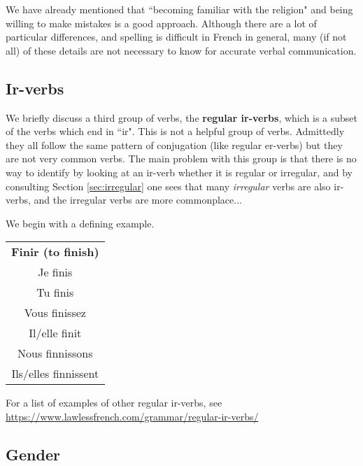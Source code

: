 \documentclass[12pt]{article}
\theoremstyle{plain}
\theoremstyle{definition}
\begin{document}
	We have already mentioned that ``becoming familiar with the religion" and being willing to make mistakes is a good approach. Although there are a lot of particular differences, and spelling is difficult in French in general, many (if not all) of these details are not necessary to know for accurate verbal communication.
	
	\subsection{Ir-verbs}
	We briefly discuss a third group of verbs, the \textbf{regular ir-verbs}, which is a subset of the verbs which end in ``ir". This is not a helpful group of verbs. Admittedly they all follow the same pattern of conjugation (like regular er-verbs) but they are not very common verbs. The main problem with this group is that there is no way to identify by looking at an ir-verb whether it is regular or irregular, and by consulting Section \ref{sec:irregular} one sees that many \emph{irregular} verbs are also ir-verbs, and the irregular verbs are more commonplace...
	
	We begin with a defining example.
	\begin{center}
		\begin{tabular}{|c|}
			\hline
			\textbf{Finir (to finish)}\\
			Je finis\\
			Tu finis\\
			Vous finissez\\
			Il/elle finit\\
			Nous finnissons\\
			Ils/elles finnissent\\
			\hline
			\end{tabular}
		\end{center}
	For a list of examples of other regular ir-verbs, see\\ \url{https://www.lawlessfrench.com/grammar/regular-ir-verbs/}

	\subsection{Gender}\label{sec:gender}
\end{document}
